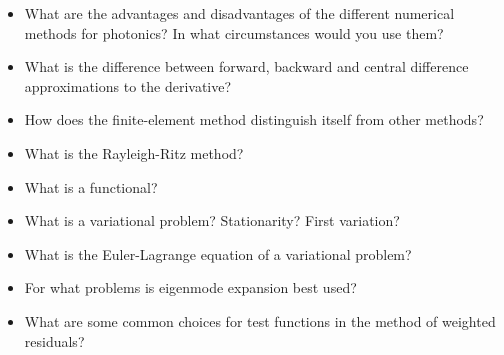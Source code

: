 \begin{itemize}
\item What are the advantages and disadvantages of the different numerical methods for photonics? In what circumstances would you use them?
\item What is the difference between forward, backward and central difference approximations to the derivative?
\item How does the finite-element method distinguish itself from other methods?
\item What is the Rayleigh-Ritz method?
\item What is a functional?
\item What is a variational problem? Stationarity? First variation?
\item What is the Euler-Lagrange equation of a variational problem?
\item For what problems is eigenmode expansion best used?
\item What are some common choices for test functions in the method of weighted residuals?  
\end{itemize}

